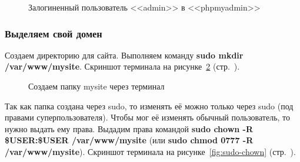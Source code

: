 \begin{figure}[p]
    \caption{Залогиненный пользователь <<admin>> в <<phpmyadmin>>}
    \label{fig:make-phpmyadmin-superuser-step-7}
\end{figure}

\newpage


\subsubsection*{Выделяем свой домен}

Создаем директорию для сайта. Выполняем команду \textbf{sudo mkdir /var/www/mysite}.
Скриншот терминала на рисунке~\ref{fig:sudo-mkdir-mysite} (стр.~\pageref{fig:sudo-mkdir-mysite}).

\begin{figure}[p]
    \caption{Создаем папку mysite через терминал}
    \label{fig:sudo-mkdir-mysite}
\end{figure}

Так как папка создана через sudo, то изменять её можно только через sudo (под правами суперпользователя). Чтобы мог её изменять обычный пользователь, то нужно выдать ему права. Выдадим права командой \textbf{sudo chown -R \$USER:\$USER /var/www/mysite} (или \textbf{sudo chmod 0777 -R /var/www/mysite}).
Скриншот терминала на рисунке~\ref{fig:sudo-chown} (стр.~\pageref{fig:sudo-chown}).


